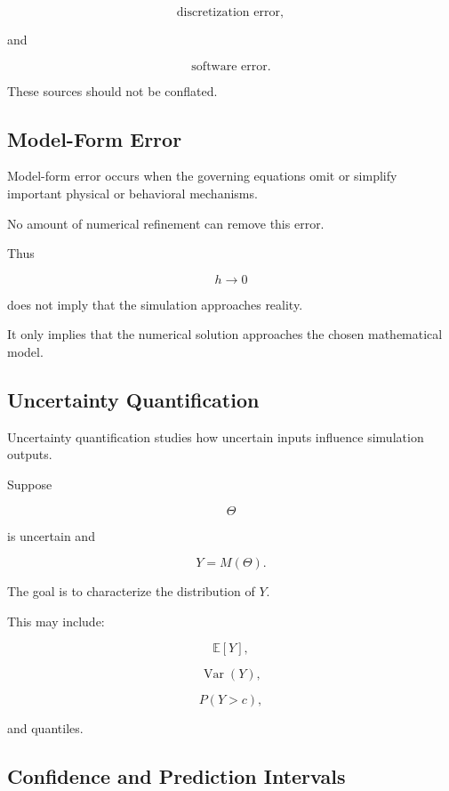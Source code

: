 \[
\boxed{
\text{discretization error},
}
\]

and

\[
\boxed{
\text{software error}.
}
\]

These sources should not be conflated.

\subsection{Model-Form Error}
\label{subsec:model-form-error}

Model-form error occurs when the governing equations omit or simplify
important physical or behavioral mechanisms.

No amount of numerical refinement can remove this error.

Thus

\[
\boxed{
h\to0
}
\]

does not imply that the simulation approaches reality.

It only implies that the numerical solution approaches the chosen
mathematical model.

\subsection{Uncertainty Quantification}
\label{subsec:simulation-uq}

Uncertainty quantification studies how uncertain inputs influence
simulation outputs.

Suppose

\[
\Theta
\]

is uncertain and

\[
Y=M(\Theta).
\]

The goal is to characterize the distribution of \(Y\).

This may include:

\[
\boxed{
\mathbb{E}[Y],
}
\]

\[
\boxed{
\operatorname{Var}(Y),
}
\]

\[
\boxed{
P(Y>c),
}
\]

and quantiles.

\subsection{Confidence and Prediction Intervals}
\label{subsec:simulation-confidence-prediction}

